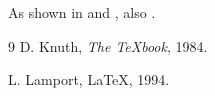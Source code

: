 \documentclass{article}
\begin{document}
As shown in \cite{knuth} and \cite[p.~5]{lamport,knuth}, also \cite{nobody}.\nocite{extra}

\begin{thebibliography}{9}
 D. Knuth, \emph{The \TeX book}, 1984.

 L. Lamport, LaTeX, 1994.
\end{thebibliography}
\end{document}
